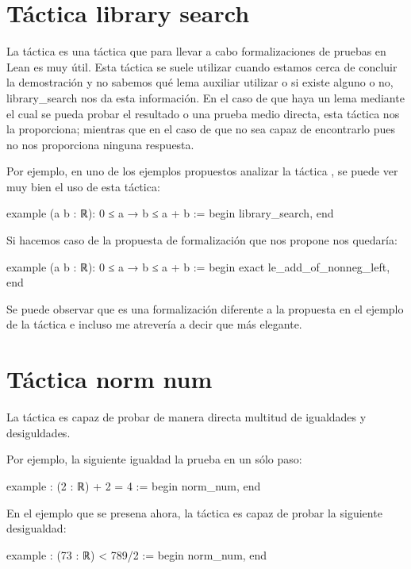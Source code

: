 \section{Táctica library search}
La táctica  es una táctica que para
llevar a cabo formalizaciones de pruebas en Lean es muy útil. Esta táctica se
suele utilizar cuando estamos cerca de concluir la demostración y no sabemos
qué lema auxiliar utilizar o si existe alguno o no, 
{library\_search} nos da esta información. En el caso de que haya un lema
mediante el cual se pueda probar el resultado o una prueba medio directa, esta
táctica nos la proporciona; mientras que en el caso de que no sea capaz de
encontrarlo pues no nos proporciona ninguna respuesta.

Por ejemplo, en uno de los ejemplos propuestos analizar la táctica
, se puede ver muy bien el uso de esta táctica:

\begin{leancode}
example (a b : ℝ): 0 ≤ a → b ≤ a + b :=
begin
  library_search,
end
\end{leancode}

Si hacemos caso de la propuesta de formalización que nos propone nos quedaría:

\begin{leancode}
example (a b : ℝ): 0 ≤ a → b ≤ a + b :=
begin
  exact le_add_of_nonneg_left,
end
\end{leancode}

Se puede observar que es una formalización diferente a la propuesta en el
ejemplo de la táctica  e incluso me atrevería a
decir que más elegante.


\section{Táctica norm num}
La táctica  es capaz de probar de manera directa
multitud de igualdades y desiguldades.

Por ejemplo, la siguiente igualdad la prueba en un sólo paso:

\begin{leancode}
example : (2 : ℝ) + 2 = 4 := 
begin
  norm_num,
end
\end{leancode}

En el ejemplo que se presena ahora, la táctica  es
capaz de probar la siguiente desigualdad:
\begin{leancode}
example : (73 : ℝ) < 789/2 := 
begin
  norm_num,
end
\end{leancode}


